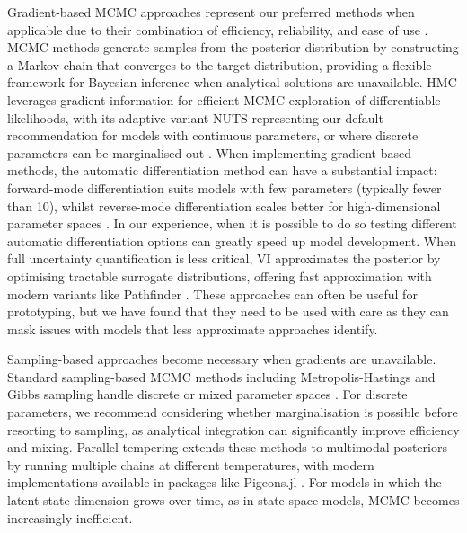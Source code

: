 \documentclass{article}
\begin{document}
Gradient-based \ac{MCMC} approaches represent our preferred methods when applicable due to their combination of efficiency, reliability, and ease of use \citep{gilks1995markov, lekone2006statistical}.
\ac{MCMC} methods generate samples from the posterior distribution by constructing a Markov chain that converges to the target distribution, providing a flexible framework for Bayesian inference when analytical solutions are unavailable.
\ac{HMC} leverages gradient information for efficient \ac{MCMC} exploration of differentiable likelihoods, with its adaptive variant \ac{NUTS} representing our default recommendation for models with continuous parameters, or where discrete parameters can be marginalised out \citep{duane1987hybrid, hoffman2014no, andrade2020evaluation}.
When implementing gradient-based methods, the automatic differentiation method can have a substantial impact: forward-mode differentiation suits models with few parameters (typically fewer than 10), whilst reverse-mode differentiation scales better for high-dimensional parameter spaces \citep{baydin2018automatic, andelfinger2023towards}.
In our experience, when it is possible to  do so testing different automatic differentiation options can greatly speed up model development.
When full uncertainty quantification is less critical, \ac{VI} approximates the posterior by optimising tractable surrogate distributions, offering fast approximation with modern variants like Pathfinder \citep{blei2017variational, chatzilena2019contemporary}.
These approaches can often be useful for prototyping, but we have found that they need to be used with care as they can mask issues with models that less approximate approaches identify.

Sampling-based approaches become necessary when gradients are unavailable.
Standard sampling-based \ac{MCMC} methods including Metropolis-Hastings and Gibbs sampling handle discrete or mixed parameter spaces \citep{hastings1970monte, geman1984stochastic, gilks1995markov}.
For discrete parameters, we recommend considering whether marginalisation is possible before resorting to sampling, as analytical integration can significantly improve efficiency and mixing.
Parallel tempering extends these methods to multimodal posteriors by running multiple chains at different temperatures, with modern implementations available in packages like Pigeons.jl \citep{surjanovic2023pigeons}.
For models in which the latent state dimension grows over time, as in state-space models, \ac{MCMC} becomes increasingly inefficient.
\end{document}
